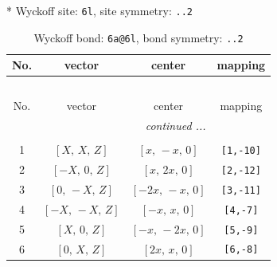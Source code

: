 \documentclass[fleqn,8pt]{jsarticle}
\begin{document}
* Wyckoff site: {\tt 6l}, site symmetry: {\tt ..2}
\renewcommand{\arraystretch}{1.2}
\begin{longtable}{cccc}
\caption{Wyckoff bond: {\tt 6a@6l}, bond symmetry: {\tt ..2}}
 \\
 \hline \hline
No. & vector & center & mapping \\ \hline \endfirsthead

\multicolumn{3}{l}{\tablename\ \thetable{}} \\
 \hline \hline
No. & vector & center & mapping \\ \hline \endhead

 \hline \hline
\multicolumn{3}{r}{\footnotesize\it continued ...} \\ \endfoot

 \hline \hline
\multicolumn{3}{r}{} \\ \endlastfoot

1 & $\left[ X,\, X,\, Z \right]$ & $\left[ x,\, - x,\, 0 \right]$ & {\tt [1,-10]} \\ \hline
2 & $\left[ - X,\, 0,\, Z \right]$ & $\left[ x,\, 2 x,\, 0 \right]$ & {\tt [2,-12]} \\ \hline
3 & $\left[ 0,\, - X,\, Z \right]$ & $\left[ - 2 x,\, - x,\, 0 \right]$ & {\tt [3,-11]} \\ \hline
4 & $\left[ - X,\, - X,\, Z \right]$ & $\left[ - x,\, x,\, 0 \right]$ & {\tt [4,-7]} \\ \hline
5 & $\left[ X,\, 0,\, Z \right]$ & $\left[ - x,\, - 2 x,\, 0 \right]$ & {\tt [5,-9]} \\ \hline
6 & $\left[ 0,\, X,\, Z \right]$ & $\left[ 2 x,\, x,\, 0 \right]$ & {\tt [6,-8]} \\
\end{longtable}
\renewcommand{\arraystretch}{1.2}
\end{document}

